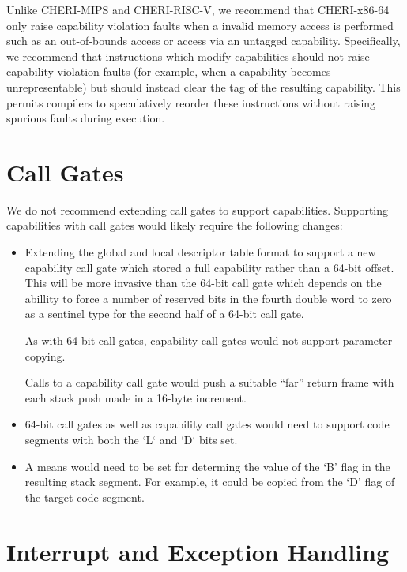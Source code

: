 Unlike CHERI-MIPS and CHERI-RISC-V, we recommend that CHERI-x86-64
only raise capability violation faults when a invalid memory access is
performed such as an out-of-bounds access or access via an untagged
capability.  Specifically, we recommend that instructions which modify
capabilities should not raise capability violation faults (for
example, when a capability becomes unrepresentable) but should instead
clear the tag of the resulting capability.  This permits compilers to
speculatively reorder these instructions without raising spurious
faults during execution.

\section{Call Gates}

We do not recommend extending call gates to support capabilities.
Supporting capabilities with call gates would likely require the
following changes:

\begin{itemize}
  \item Extending the global and local descriptor table format to
    support a new capability call gate which stored a full capability
    rather than a 64-bit offset.  This will be more invasive than the
    64-bit call gate which depends on the abillity to force a number
    of reserved bits in the fourth double word to zero as a sentinel
    type for the second half of a 64-bit call gate.

    As with 64-bit call gates, capability call gates would not support
    parameter copying.

    Calls to a capability call gate would push a suitable ``far''
    return frame with each stack push made in a 16-byte increment.

  \item 64-bit call gates as well as capability call gates would need
    to support code segments with both the `L` and `D` bits set.

  \item A means would need to be set for determing the value of the
    `B' flag in the resulting stack segment.  For example, it could be
    copied from the `D' flag of the target code segment.
\end{itemize}

\section{Interrupt and Exception Handling}
\label{sec:x86:interrupt-exception}

